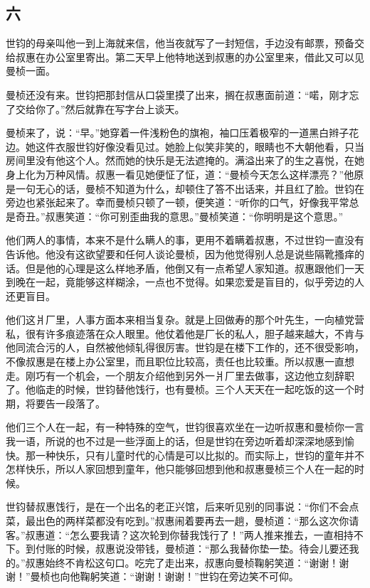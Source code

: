 \subsection{六}

\par 世钧的母亲叫他一到上海就来信，他当夜就写了一封短信，手边没有邮票，预备交给叔惠在办公室里寄出。第二天早上他特地送到叔惠的办公室里来，借此又可以见曼桢一面。
\par 曼桢还没有来。世钧把那封信从口袋里摸了出来，搁在叔惠面前道：“喏，刚才忘了交给你了。”然后就靠在写字台上谈天。
\par 曼桢来了，说：“早。”她穿着一件浅粉色的旗袍，袖口压着极窄的一道黑白辫子花边。她这件衣服世钧好像没看见过。她脸上似笑非笑的，眼睛也不大朝他看，只当房间里没有他这个人。然而她的快乐是无法遮掩的。满溢出来了的生之喜悦，在她身上化为万种风情。叔惠一看见她便怔了怔，道：“曼桢今天怎么这样漂亮？”他原是一句无心的话，曼桢不知道为什么，却顿住了答不出话来，并且红了脸。世钧在旁边也紧张起来了。幸而曼桢只顿了一顿，便笑道：“听你的口气，好像我平常总是奇丑。”叔惠笑道：“你可别歪曲我的意思。”曼桢笑道：“你明明是这个意思。”
\par 他们两人的事情，本来不是什么瞒人的事，更用不着瞒着叔惠，不过世钧一直没有告诉他。他没有这欲望要和任何人谈论曼桢，因为他觉得别人总是说些隔靴搔痒的话。但是他的心理是这么样地矛盾，他倒又有一点希望人家知道。叔惠跟他们一天到晚在一起，竟能够这样糊涂，一点也不觉得。如果恋爱是盲目的，似乎旁边的人还更盲目。
\par 他们这爿厂里，人事方面本来相当复杂。就是上回做寿的那个叶先生，一向植党营私，很有许多痕迹落在众人眼里。他仗着他是厂长的私人，胆子越来越大，不肯与他同流合污的人，自然被他倾轧得很厉害。世钧是在楼下工作的，还不很受影响，不像叔惠是在楼上办公室里，而且职位比较高，责任也比较重。所以叔惠一直想走。刚巧有一个机会，一个朋友介绍他到另外一爿厂里去做事，这边他立刻辞职了。他临走的时候，世钧替他饯行，也有曼桢。三个人天天在一起吃饭的这一个时期，将要告一段落了。
\par 他们三个人在一起，有一种特殊的空气，世钧很喜欢坐在一边听叔惠和曼桢你一言我一语，所说的也不过是一些浮面上的话，但是世钧在旁边听着却深深地感到愉快。那一种快乐，只有儿童时代的心情是可以比拟的。而实际上，世钧的童年并不怎样快乐，所以人家回想到童年，他只能够回想到他和叔惠曼桢三个人在一起的时候。
\par 世钧替叔惠饯行，是在一个出名的老正兴馆，后来听见别的同事说：“你们不会点菜，最出色的两样菜都没有吃到。”叔惠闹着要再去一趟，曼桢道：“那么这次你请客。”叔惠道：“怎么要我请？这次轮到你替我饯行了！”两人推来推去，一直相持不下。到付账的时候，叔惠说没带钱，曼桢道：“那么我替你垫一垫。待会儿要还我的。”叔惠始终不肯松这句口。吃完了走出来，叔惠向曼桢鞠躬笑道：“谢谢！谢谢！”曼桢也向他鞠躬笑道：“谢谢！谢谢！”世钧在旁边笑不可仰。
